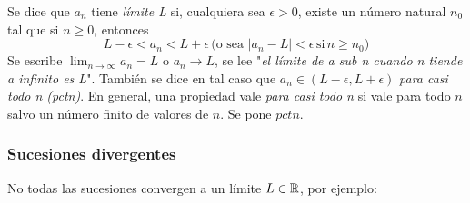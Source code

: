\documentclass[../teoria.root.tex]{subfiles}
\begin{document}
Se dice que \(a_n\) tiene \textit{límite L} si, cualquiera sea \(\epsilon>0\), existe un número natural \(n_0\) tal que si \(n\geq0\), entonces \[L-\epsilon<a_n<L+\epsilon\,\text{(o sea \(|a_n-L|<\epsilon\,\text{si}\,n\geq n_0\))}\]
Se escribe \(\lim_{n\to\infty}a_n=L\) o \(a_n\rightarrow L\), se lee "\textit{el límite de a sub n cuando n tiende a infinito es L}".
También se dice en tal caso que \(a_n\in(L-\epsilon,L+\epsilon)\) \textit{para casi todo n (pctn)}.
En general, una propiedad vale \textit{para casi todo n} si vale para todo \(n\) salvo un número finito de valores de \(n\).
Se pone \(pctn\).
\subsubsection{Sucesiones divergentes}
No todas las sucesiones convergen a un límite \(L\in\mathbb{R}\), por ejemplo:
\end{document}
